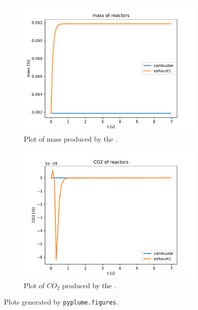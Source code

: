 \documentclass[smallextended,referee]{svjour3}
\begin{document}
\begin{figure}[ht]
\begin{subfigure}{.6\textwidth}
  \centering
  \includegraphics[scale=0.45]{examples/report/figures/mass.pdf}  
  \caption{Plot of mass produced by the \pyplume{}.}
  \label{fig:sub-first}
\end{subfigure}
\begin{subfigure}{.6\textwidth}
  \centering
  \includegraphics[scale=0.45]{examples/report/figures/CO2.pdf}  
  \caption{Plot of $CO_2$ produced by the \pyplume{}.}
  \label{fig:sub-second}
\end{subfigure}
\caption{Plots generated by \texttt{pyplume.figures}.}
\label{fig:plots}
\end{figure}
\end{document}
